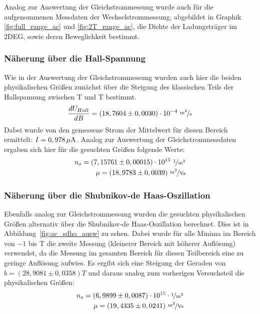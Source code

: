 

Analog zur Auswertung der Gleichstrommessung wurde auch für die aufgenommenen Messdaten der Wechselstrommessung, abgebildet in Graphik \ref{fig:full_range_ac} und \ref{fig:2T_range_ac}, die Dichte der Ladungsträger im 2DEG, sowie deren Beweglichkeit bestimmt.

\subsubsection{Näherung über die Hall-Spannung}
\label{ch:naeherung_hall2}

Wie in der Auswertung der Gleichstrommessung wurden auch hier die beiden physikalischen Größen zunächst über die Steigung des klassischen Teils der Hallspannung zwischen \unit[-1]{T} und \unit[1]{T} bestimmt.
\begin{equation}
	\d{U_{Hall}}{B} = ( 18,7604 \pm 0,0030 ) \cdot 10^{-4} ~ \unitfrac{m^2}{s}
\end{equation} %
Dabei wurde von den gemessene Strom der Mittelwert für diesen Bereich ermittelt: $I=\unit[0,978]{\mu A}$. Analog zur Auswertung der Gleichstrommessdaten ergaben sich hier für die gesuchten Größen folgende Werte: 
\begin{align}
n_s=  ( 7,15761 \pm 0,00015) \cdot 10^{15} ~ \unitfrac{1}{m^2}\\ %
\mu= (18,9783\pm 0,0039) ~ \unitfrac{m^2}{Vs} %
\end{align}


\subsubsection{Näherung über die Shubnikov-de Haas-Oszillation}
\label{ch:naeherung_ac}

Ebenfalls analog zur Gleichstrommessung wurden die gesuchten physikalischen Größen alternativ über die Shubnikov-de Haas-Oszillation berechnet. Dies ist in Abbildung~\ref{fig:ac_sdho_ausw} zu sehen. Dabei wurde für alle Minima im Bereich von $-1$ bis \unit[1]{T} die zweite Messung (kleinerer Bereich mit höherer Auflösung) verwendet, da die Messung im gesamten Bereich für diesen Teilbereich eine zu geringe Auflösung aufwies.
Es ergibt sich eine Steigung der Geraden von $b=(28,9081 \pm 0,0358)\unit{T}$ und daraus analog zum vorherigen Versuchsteil die physikalischen Größen: 
\begin{align}
n_s= (6,9899 \pm 0,0087)\cdot 10^{15} \cdot \unitfrac{1}{m^2} \\ %
\mu= (19,4335 \pm 0,0241) ~ \unitfrac{m^2}{Vs} %
\end{align} 
   
